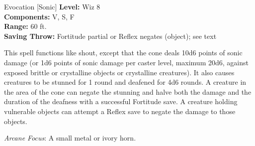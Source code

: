 {Evocation [Sonic]}
{
	\textbf{Level:}
	Wiz 8\\
	\textbf{Components:}
	V, S, F\\
	\textbf{Range:}
	60 ft.\\
	\textbf{Saving Throw:}
	Fortitude partial or Reflex negates (object); see text\\
}
{
	This spell functions like shout, except that the cone deals 10d6 points of sonic damage (or 1d6 points of sonic damage per caster level, maximum 20d6, against exposed brittle or crystalline objects or crystalline creatures). It also causes creatures to be stunned for 1 round and deafened for 4d6 rounds. A creature in the area of the cone can negate the stunning and halve both the damage and the duration of the deafness with a successful Fortitude save. A creature holding vulnerable objects can attempt a Reflex save to negate the damage to those objects.

	\textit{Arcane Focus}:
	A small metal or ivory horn.

}
